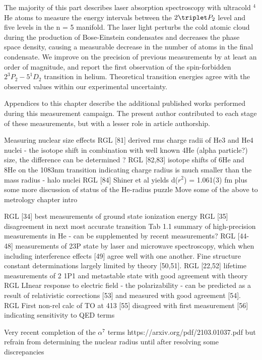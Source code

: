 The majority of this part describes laser absorption spectroscopy with ultracold $^4$He atoms to measure the energy intervals between the $2\triplet P_2$ level and five levels in the n = 5 manifold. The laser light perturbs the cold atomic cloud during the production of Bose-Einstein condensates and decreases the phase space density, causing a measurable decrease in the number of atoms in the final condensate. We improve on the precision of previous measurements by at least an order of magnitude, and report the first observation of the spin-forbidden $2^{3\!}P_2 - 5^{1\!}D_2$ transition in helium. Theoretical transition energies agree with the observed values within our experimental uncertainty.

Appendices to this chapter describe the additional published works performed during this measurement campaign. The present author contributed to each stage of these measurements, but with a lesser role in article authorship.

Measuring nuclear size effects
			RGL [81] derived rms charge radii of He3 and He4 nuclei - the isotope shift in combination with well known 4He (alpha particle?) size, the difference can be determined ? 
			RGL [82,83] isotope shifts of 6He and 8He on the 1083nm transition indicating charge radius is much smaller than the mass radius - halo nuclei 
			RGL [84] Shiner et al yields d($r^2$) = 1.061(3) fm 
			plus some more discussion of status of the He-radius puzzle 
			Move some of the above to metrology chapter intro

						RGL [34] best measurements of ground state ionization energy 
			RGL [35] disagreement in next most accurate transition 
			    Tab 1.1 summary of high-precision measurements in He - can be supplemented by recent measurements?
			RGL [44-48] measurements of 23P state by laser and microwave spectroscopy, which when including interference effects [49] agree well with one another. Fine structure constant determinations largely limited by theory [50,51]. 
			RGL [22,52] lifetime measurements of 2 1P1 and metastable state with good agreement with theory 
			RGL LInear response to electric field - the polarizability - can be predicted as a result of relativistic corrections [53] and measured with good agreement [54].  
			RGL First non-rel calc of TO at 413 [55] disagreed with first measurement [56] indicating sensitivity to QED terms 

Very recent completion of the $\alpha^7$ terms https://arxiv.org/pdf/2103.01037.pdf but refrain from determining the nuclear radius until after resolving some discrepancies